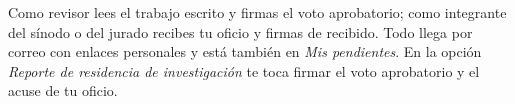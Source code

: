 \documentclass[11pt,a4paper]{article}
\begin{document}
{\small\tableofcontents}
\newpage
\begin{quevasahacer}
Como revisor lees el trabajo escrito y firmas el voto aprobatorio; como integrante del sínodo o del jurado recibes tu oficio y firmas de recibido. Todo llega por correo con enlaces personales y está también en \emph{Mis pendientes}. En la opción \emph{Reporte de residencia de investigación} te toca firmar el voto aprobatorio y el acuse de tu oficio.
\end{quevasahacer}



\end{document}
